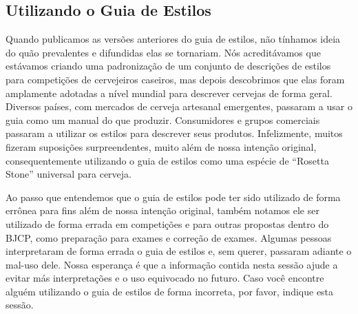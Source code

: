 \subsection*{Utilizando o Guia de Estilos}
Quando publicamos as versões anteriores do guia de estilos, não tínhamos ideia do quão prevalentes e difundidas elas se tornariam. Nós acreditávamos que estávamos criando uma padronização de um conjunto de descrições de estilos para competições de cervejeiros caseiros, mas depois descobrimos que elas foram amplamente adotadas a nível mundial para descrever cervejas de forma geral. Diversos países, com mercados de cerveja artesanal emergentes, passaram a usar o guia como um manual do que produzir. Consumidores e grupos comerciais passaram a utilizar os estilos para descrever seus produtos. Infelizmente, muitos fizeram suposições surpreendentes, muito além de nossa intenção original, consequentemente utilizando o guia de estilos como uma espécie de “Rosetta Stone” universal para cerveja.

Ao passo que entendemos que o guia de estilos pode ter sido utilizado de forma errônea para fins além de nossa intenção original, também notamos ele ser utilizado de forma errada em competições e para outras propostas dentro do BJCP, como preparação para exames e correção de exames. Algumas pessoas interpretaram de forma errada o guia de estilos e, sem querer, passaram adiante o mal-uso dele. Nossa esperança é que a informação contida nesta sessão ajude a evitar más interpretações e o uso equivocado no futuro. Caso você encontre alguém utilizando o guia de estilos de forma incorreta, por favor, indique esta sessão.

